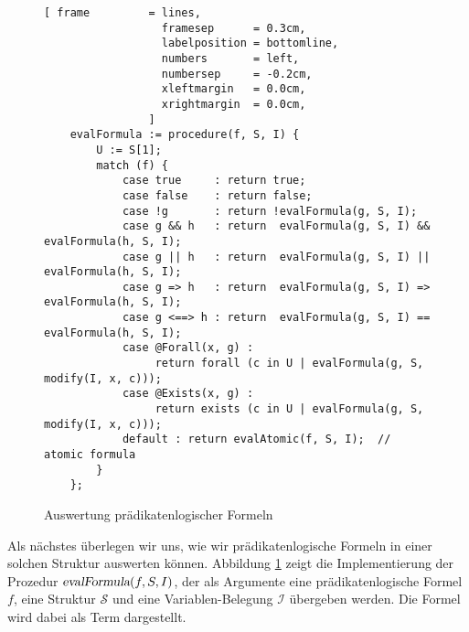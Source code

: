 \begin{figure}[!ht]
\centering
\begin{Verbatim}[ frame         = lines, 
                  framesep      = 0.3cm, 
                  labelposition = bottomline,
                  numbers       = left,
                  numbersep     = -0.2cm,
                  xleftmargin   = 0.0cm,
                  xrightmargin  = 0.0cm,
                ]
    evalFormula := procedure(f, S, I) {
        U := S[1];
        match (f) {
            case true     : return true;
            case false    : return false;
            case !g       : return !evalFormula(g, S, I);
            case g && h   : return  evalFormula(g, S, I) && evalFormula(h, S, I);
            case g || h   : return  evalFormula(g, S, I) || evalFormula(h, S, I);
            case g => h   : return  evalFormula(g, S, I) => evalFormula(h, S, I);
            case g <==> h : return  evalFormula(g, S, I) == evalFormula(h, S, I);
            case @Forall(x, g) : 
                 return forall (c in U | evalFormula(g, S, modify(I, x, c)));
            case @Exists(x, g) : 
                 return exists (c in U | evalFormula(g, S, modify(I, x, c)));
            default : return evalAtomic(f, S, I);  // atomic formula
        }
    };
\end{Verbatim}
\vspace*{-0.3cm}
\caption{Auswertung pr\"{a}dikatenlogischer Formeln}
\label{fig:pl-evaluate.stlx}
\end{figure}

Als n\"{a}chstes \"{u}berlegen wir uns, wie wir pr\"{a}dikatenlogische Formeln in einer solchen Struktur
auswerten k\"{o}nnen.  Abbildung \ref{fig:pl-evaluate.stlx} zeigt die Implementierung der Prozedur
$\textsl{evalFormula}(f, S, I)$, der als Argumente eine pr\"{a}dikatenlogische Formel $f$, eine Struktur
$\mathcal{S}$ und eine Variablen-Belegung $\mathcal{I}$ \"{u}bergeben werden.  Die Formel wird
dabei als Term dargestellt.  

